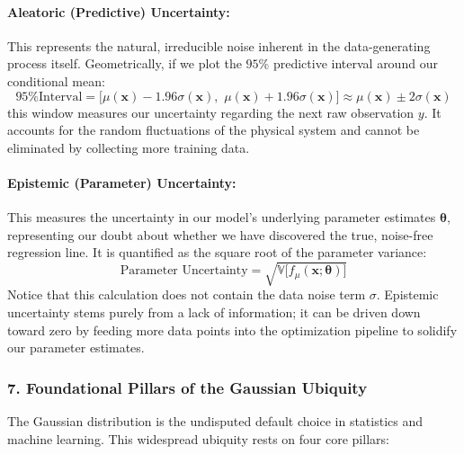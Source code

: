 \documentclass{article}
\begin{document}
\paragraph{Aleatoric (Predictive) Uncertainty:}
This represents the natural, irreducible noise inherent in the data-generating process itself. Geometrically, if we plot the $95\%$ predictive interval around our conditional mean:
\begin{equation}
    \text{95\% Interval} = \big[\mu(\mathbf{x}) - 1.96\sigma(\mathbf{x}), \,\, \mu(\mathbf{x}) + 1.96\sigma(\mathbf{x})\big] \approx \mu(\mathbf{x}) \pm 2\sigma(\mathbf{x})
\end{equation}
this window measures our uncertainty regarding the next raw observation $y$. It accounts for the random fluctuations of the physical system and cannot be eliminated by collecting more training data.

\paragraph{Epistemic (Parameter) Uncertainty:}
This measures the uncertainty in our model's underlying parameter estimates $\boldsymbol{\theta}$, representing our doubt about whether we have discovered the true, noise-free regression line. It is quantified as the square root of the parameter variance:
\begin{equation}
    \text{Parameter Uncertainty} = \sqrt{\mathbb{V}\big[f_\mu(\mathbf{x}; \boldsymbol{\theta})\big]}
\end{equation}
Notice that this calculation does not contain the data noise term $\sigma$. Epistemic uncertainty stems purely from a lack of information; it can be driven down toward zero by feeding more data points into the optimization pipeline to solidify our parameter estimates.

\subsubsection*{7. Foundational Pillars of the Gaussian Ubiquity}
The Gaussian distribution is the undisputed default choice in statistics and machine learning. This widespread ubiquity rests on four core pillars:
\end{document}
